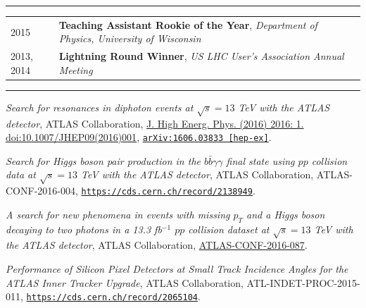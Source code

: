 \documentclass{letter}
\begin{document}
\vspace{-10pt}

\begin{flushleft}
\Large{\textsc{\textbf{\color{Maroon}{Awards}}}}
\vspace{1pt} %
\hrule
\end{flushleft}

\begin{tabular}{p{}p{}}
	2015
	&
	\textbf{Teaching Assistant Rookie of the Year}, \textit{Department of Physics, University of Wisconsin} 
\\
	2013, 2014
	& 
	\textbf{Lightning Round Winner}, \textit{US LHC User's Association Annual Meeting}
\\
\end{tabular}


\begin{flushleft}
\Large{\textsc{\textbf{\color{Maroon}{Selected Publications}}}}
\vspace{1pt} %
\hrule
\end{flushleft}

\textit{Search for resonances in diphoton events at $\sqrt{s}=13$ TeV with the ATLAS detector}, ATLAS Collaboration, \href{http://link.springer.com/article/10.1007/JHEP09(2016)001}{J. High Energ. Phys. (2016) 2016: 1. doi:10.1007/JHEP09(2016)001}, \href{http://arxiv.org/abs/1606.03833}{\texttt{arXiv:1606.03833 [hep-ex]}}.

\textit{Search for Higgs boson pair production in the $b \bar{b} \gamma \gamma$ final state using $pp$ collision data at $\sqrt{s}=13$ TeV with the ATLAS detector}, ATLAS Collaboration, ATLAS-CONF-2016-004, \href{https://cds.cern.ch/record/2138949}{\texttt{https://cds.cern.ch/record/2138949}}.

\textit{A search for new phenomena in events with missing $p_{T}$ and a Higgs boson decaying to two photons in a 13.3 fb$^{-1}$ $pp$ collision dataset at $\sqrt{s}=13$ TeV with the ATLAS detector}, ATLAS Collaboration, \href{https://cds.cern.ch/record/2206281}{ATLAS-CONF-2016-087}.

\textit{Performance of Silicon Pixel Detectors at Small Track Incidence Angles for the ATLAS Inner Tracker Upgrade}, ATLAS Collaboration, ATL-INDET-PROC-2015-011, \href{https://cds.cern.ch/record/2065104}{\texttt{https://cds.cern.ch/record/2065104}}.
\end{document}
